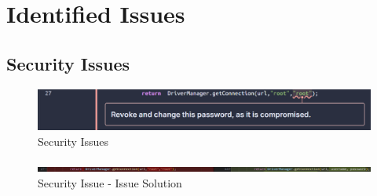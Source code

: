 \documentclass[12pt,a4paper]{article}
\begin{document}
\section{Identified Issues}
\subsection{Security Issues}
\begin{figure}[H]
    \centering
    \includegraphics[width=1\textwidth]{AbdouPhotos/Security/SecurityIssue.png}
    \caption{Security Issues}
    \label{fig:SI}
\end{figure}
\begin{figure}[H]
    \centering
    \includegraphics[width=1\textwidth]{AbdouPhotos/Security/SecurityIssueSolution.png}
    \caption{ Security Issue -  Issue Solution}
    \label{fig:MI-1stS}
\end{figure}
\end{document}
